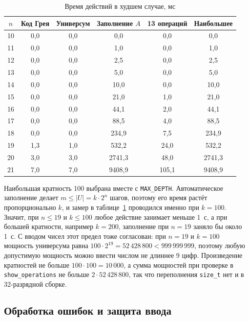 \documentclass[14pt,a4paper]{extarticle}
\newcommand{\code}[1]{\texttt{#1}}
\newcommand{\us}{\_\allowbreak{}}
\begin{document}
\begin{table}[H]
\caption{Время действий в худшем случае, мс}\label{tab:bench}
\centering
\small
\begin{tabular}{|c|c|c|c|c|c|}
\hline
$n$ & Код Грея & Универсум & Заполнение $A$ & 13 операций & Наибольшее \\\hline
10 & 0,0 & 0,0 & 0,0 & 0,0 & 0,0 \\\hline
11 & 0,0 & 0,0 & 1,0 & 0,0 & 1,0 \\\hline
12 & 0,0 & 0,0 & 2,5 & 0,0 & 2,5 \\\hline
13 & 0,0 & 0,0 & 5,0 & 0,0 & 5,0 \\\hline
14 & 0,0 & 0,0 & 10,0 & 0,0 & 10,0 \\\hline
15 & 0,0 & 0,0 & 21,0 & 1,0 & 21,0 \\\hline
16 & 0,0 & 0,0 & 44,1 & 2,0 & 44,1 \\\hline
17 & 0,0 & 0,0 & 88,5 & 4,0 & 88,5 \\\hline
18 & 0,0 & 0,0 & 234,9 & 7,5 & 234,9 \\\hline
19 & 1,3 & 1,0 & 532,2 & 24,0 & 532,2 \\\hline
20 & 3,0 & 3,0 & 2741,3 & 48,0 & 2741,3 \\\hline
21 & 7,0 & 7,0 & 9408,9 & 105,1 & 9408,9 \\\hline
\end{tabular}
\end{table}

Наибольшая кратность 100 выбрана вместе с \code{MAX\us{}DEPTH}. Автоматическое заполнение делает $m \leqslant |U| = k \cdot 2^n$ шагов, поэтому его время растёт пропорционально $k$, и замер в таблице~\ref{tab:bench} проводился именно при $k = 100$. Значит, при $n \leqslant 19$ и $k \leqslant 100$ любое действие занимает меньше 1~с, а при большей кратности, например $k = 200$, заполнение при $n = 19$ заняло бы около 1~с. С вводом чисел этот предел тоже согласован: при $n = 19$ и $k = 100$ мощность универсума равна $100 \cdot 2^{19} = 52\,428\,800 < 999\,999\,999$, поэтому любую допустимую мощность можно ввести числом не длиннее 9 цифр. Произведение кратностей не больше $100 \cdot 100 = 10\,000$, а сумма мощностей при проверке в \code{show\us{}operations} не больше $2 \cdot 52\,428\,800$, так что переполнения \code{size\us{}t} нет и в 32-разрядной сборке.

\subsection{Обработка ошибок и защита ввода}
\end{document}
